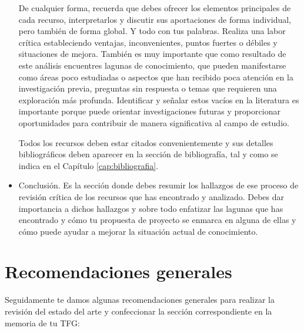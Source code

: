 \begin{itemize}
    De cualquier forma, recuerda que debes ofrecer los elementos principales de cada recurso, interpretarlos y discutir sus aportaciones de forma individual, pero también de forma global. Y todo con tus palabras. Realiza una labor crítica estableciendo ventajas, inconvenientes, puntos fuertes o débiles y situaciones de mejora. También es muy importante que como resultado de este análisis encuentres lagunas de conocimiento, que pueden manifestarse como áreas poco estudiadas o aspectos que han recibido poca atención en la investigación previa, preguntas sin respuesta o temas que requieren una exploración más profunda. Identificar y señalar estos vacíos en la literatura es importante porque puede orientar investigaciones futuras y proporcionar oportunidades para contribuir de manera significativa al campo de estudio.

    Todos los recursos deben estar citados convenientemente y sus detalles bibliográficos deben aparecer en la sección de bibliografía, tal y como se indica en el Capítulo \ref{cap:bibliografia}.

    \item Conclusión. Es la sección donde debes resumir los hallazgos de ese proceso de revisión crítica de los recursos que has encontrado y analizado. Debes dar importancia a dichos hallazgos y sobre todo enfatizar las lagunas que has encontrado y cómo tu propuesta de proyecto se enmarca en alguna de ellas y cómo puede ayudar a mejorar la situación actual de conocimiento.
\end{itemize}

\section{Recomendaciones generales}

Seguidamente te damos algunas recomendaciones generales para realizar la revisión del estado del arte y confeccionar la sección correspondiente en la memoria de tu TFG:

